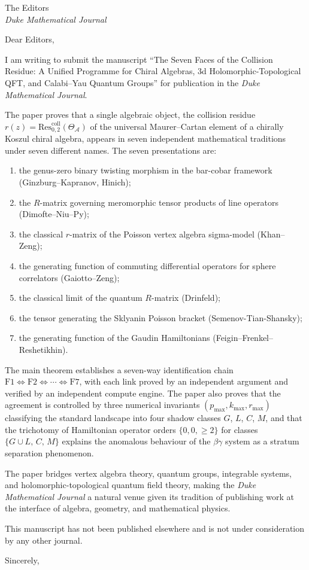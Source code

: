 \documentclass[11pt]{letter}
\date{\today}
\begin{document}
\begin{letter}{The Editors\\
\emph{Duke Mathematical Journal}}

\opening{Dear Editors,}

I am writing to submit the manuscript ``The Seven Faces of the
Collision Residue: A Unified Programme for Chiral Algebras, 3d
Holomorphic-Topological QFT, and Calabi--Yau Quantum Groups'' for
publication in the \emph{Duke Mathematical Journal}.

The paper proves that a single algebraic object, the collision
residue $r(z) = \mathrm{Res}^{\mathrm{coll}}_{0,2}(\Theta_{\mathcal{A}})$
of the universal Maurer--Cartan element of a chirally Koszul chiral
algebra, appears in seven independent mathematical traditions under
seven different names. The seven presentations are:
\begin{enumerate}
\item the genus-zero binary twisting morphism in the bar-cobar
 framework (Ginzburg--Kapranov, Hinich);
\item the $R$-matrix governing meromorphic tensor products of line
 operators (Dimofte--Niu--Py);
\item the classical $r$-matrix of the Poisson vertex algebra
 sigma-model (Khan--Zeng);
\item the generating function of commuting differential operators
 for sphere correlators (Gaiotto--Zeng);
\item the classical limit of the quantum $R$-matrix (Drinfeld);
\item the tensor generating the Sklyanin Poisson bracket
 (Semenov-Tian-Shansky);
\item the generating function of the Gaudin Hamiltonians
 (Feigin--Frenkel--Reshetikhin).
\end{enumerate}

The main theorem establishes a seven-way identification chain
$\mathrm{F1} \Leftrightarrow \mathrm{F2} \Leftrightarrow \cdots
\Leftrightarrow \mathrm{F7}$, with each link proved by an
independent argument and verified by an independent compute engine.
The paper also proves that the agreement is controlled by three
numerical invariants $(p_{\max}, k_{\max}, r_{\max})$ classifying
the standard landscape into four shadow classes $G$, $L$, $C$, $M$,
and that the trichotomy of Hamiltonian operator orders
$\{0, 0, \geq 2\}$ for classes $\{G \cup L,\, C,\, M\}$ explains
the anomalous behaviour of the $\beta\gamma$ system as a stratum
separation phenomenon.

The paper bridges vertex algebra theory, quantum groups, integrable
systems, and holomorphic-topological quantum field theory, making
the \emph{Duke Mathematical Journal} a natural venue given its
tradition of publishing work at the interface of algebra,
geometry, and mathematical physics.

This manuscript has not been published elsewhere and is not under
consideration by any other journal.

\closing{Sincerely,}

\end{letter}
\end{document}

